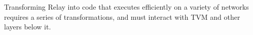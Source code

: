 
Transforming Relay into code that executes efficiently on a variety of networks requires a series of transformations, and must interact with TVM and other layers below it.

